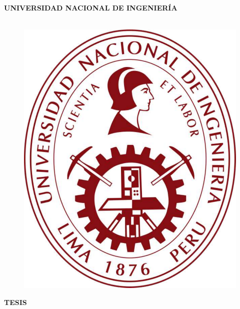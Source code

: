 \begin{titlepage}

    \begin{center}
    {\LARGE \textbf{UNIVERSIDAD NACIONAL DE INGENIERÍA}}
        \\
        \vspace{5 mm}
        {\large \textbf{\@facultad}}\\
        \vspace{5 mm}
        \begin{figure}[h]
            \centering
            \includegraphics[scale=0.25]{E_IMAGENES/0_Caratula/UNI_LOGO1_GRANATE.pdf}
        \end{figure}
        \vspace{1 mm}
        {\Large \textbf{TESIS} }\\
        \vspace{5 mm}

        \onehalfspacing  %
        {\Large \textbf{{\@titlecaratula}} }\\

        \singlespacing  %


\end{center}
\end{titlepage}
